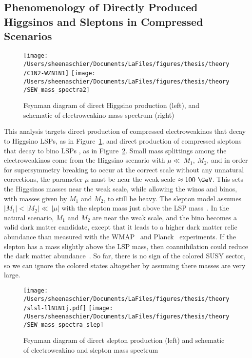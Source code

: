\subsection{Phenomenology of Directly Produced Higgsinos and Sleptons in Compressed Scenarios}
\label{sec:pheno}
 \begin{figure}%
  \begin{center}
  \texttt{[image: /Users/sheenaschier/Documents/LaFiles/figures/thesis/theory/C1N2-WZN1N1]}
  \texttt{[image: /Users/sheenaschier/Documents/LaFiles/figures/thesis/theory/SEW\_mass\_spectra2]}
   \end{center}
 \caption{Feynman diagram of direct Higgsino production (left), and schematic of electroweakino mass spectrum (right)}
 \label{fig:fn1}
 \end{figure}
This analysis targets direct production of compressed electroweakinos that decay to  Higgsino LSPs, as in Figure~\ref{fig:fn1}, and direct production of compressed sleptons that decay to bino LSPs , as in Figure~\ref{fig:fn2}.  Small mass splittings among the electroweakinos come from the Higgsino scenario with $\mu\ll~M_1,~M_2$, and in order for supersymmetry breaking to occur at the correct scale without any unnatural corrections, the parameter $\mu$ must be near the weak scale $\approx 100~\GeV$.  This sets the Higgsinos masses near the weak scale, while allowing the winos and binos, with masses given by $M_1$ and $M_2$, to still be heavy.  The slepton model assumes $|M_1| <|M_2|\ll~|\mu|$ with the slepton mass just above the LSP mass~\cite{gondolo}.  In the natural scenario, $M_1$ and $M_2$ are near the weak scale, and the bino becomes a valid dark matter candidate, except that it leads to a higher dark matter relic abundance than measured with the WMAP~\cite{Steigman:2012nb} and Planck~\cite{Busoni:2014gta} experiments.  If the slepton has a mass slightly above the LSP mass, then coannihilation could reduce the dark matter abundance~\cite{seckel}.  So far, there is no sign of the colored SUSY sector, so we can ignore the colored states altogether by assuming there masses are very large.  
   \begin{figure}%
  \begin{center}
  \texttt{[image: /Users/sheenaschier/Documents/LaFiles/figures/thesis/theory/slsl-llN1N1j.pdf]}
   \texttt{[image: /Users/sheenaschier/Documents/LaFiles/figures/thesis/theory/SEW\_mass\_spectra\_slep]}
   \end{center}
 \caption{Feynman diagram of direct slepton production (left) and schematic of electroweakino and slepton mass spectrum}
 \label{fig:fn2}
  \end{figure}

